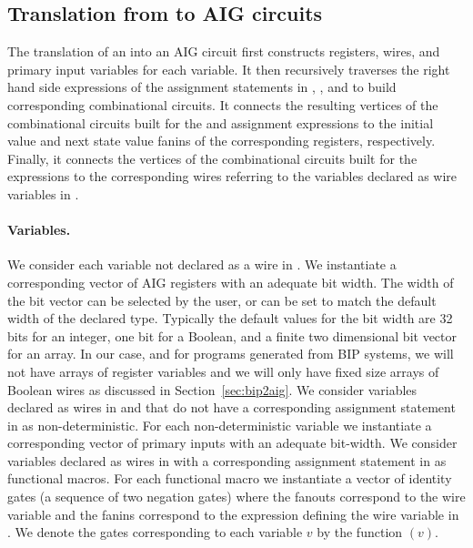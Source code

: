 
\subsection{Translation from \caig to AIG circuits }

The translation of an \caig into an AIG circuit
first constructs registers, wires, and primary input variables for each 
\caig variable. 
%
It then recursively traverses the right hand side expressions 
of the assignment statements in , ,
and  to build corresponding combinational circuits.
%
It connects the resulting vertices of the combinational 
circuits built for the  and  
assignment expressions to the 
initial value and next state value fanins of the corresponding 
registers, respectively. 
%
Finally, it connects the vertices of the combinational circuits built 
for the  expressions to the corresponding 
wires referring to the 
variables declared as wire variables in .

\paragraph{Variables.} 
%
We consider each variable not declared as a wire in .
We instantiate a corresponding 
vector of AIG registers with an adequate bit width. 
The width of the bit vector can be selected by the user, 
or can be set to match the default width of the declared type. 
Typically the default values for the bit width are 
32 bits for an integer, one bit for a Boolean, and a 
finite two dimensional bit vector for an array. 
In our case, and for \caig programs generated from BIP systems, 
we will not have arrays of register variables
and we will only have fixed size arrays of Boolean wires as 
discussed in Section~\ref{sec:bip2aig}.
%
We consider variables declared as wires in 
and that do not have a corresponding assignment statement 
in  as non-deterministic. 
For each non-deterministic variable we instantiate a corresponding
vector of primary inputs with an adequate bit-width. 
%
We consider variables declared as wires in  with 
a corresponding assignment statement in  as functional macros. 
For each functional macro we 
instantiate a vector of identity gates (a sequence of two negation gates) 
where the fanouts correspond to the wire variable and the fanins correspond to
the expression defining the wire variable in . 
%
We denote the gates corresponding to each variable $v$ by the function $(v)$. 

